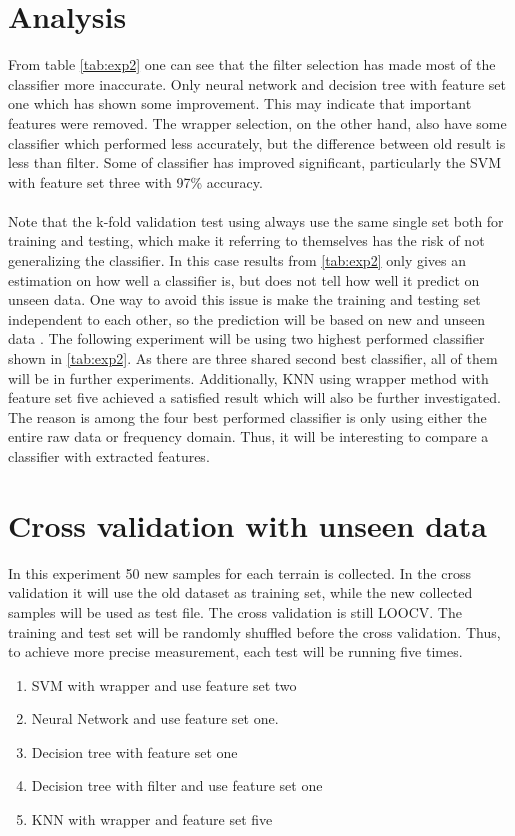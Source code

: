 \documentclass[USenglish]{ifimaster}  %
\begin{document}
	\section{Analysis}
	From table \ref{tab:exp2} one can see that the filter selection has made most of the classifier more inaccurate. Only neural network and decision tree with feature set one which has shown some improvement. This may indicate that important features were removed. The wrapper selection, on the other hand, also have some classifier which performed less accurately, but the difference between old result is less than filter. Some of classifier has improved significant, particularly the SVM with feature set three with 97\% accuracy.
	\\
	\\
	Note that the k-fold validation test using always use the same single set both for training and testing, which make it referring to themselves has the risk of not generalizing the classifier. In this case results from \ref{tab:exp2} only gives an estimation on how well a classifier is, but does not tell how well it predict on unseen data. One way to avoid this issue is make the training and testing set independent to each other, so the prediction will be based on new and unseen data \cite{26b23e912c654fe4b7478fd910130195}. The following experiment will be using two highest performed classifier shown in \ref{tab:exp2}. As there are three shared second best classifier, all of them will be in further experiments. Additionally, KNN using wrapper method with feature set five achieved a satisfied result which will also be further investigated. The reason is among the four best performed classifier is only using either the entire raw data or frequency domain. Thus, it will be interesting to compare a classifier with extracted features.
	
	\section{Cross validation with unseen data} \label{seq:crossunseen}
	In this experiment 50 new samples for each terrain is collected. In the cross validation it will use the old dataset as training set, while the new collected samples will be used as test file. The cross validation is still LOOCV. The training and test set will be randomly shuffled before the cross validation. Thus, to achieve more precise measurement, each test will be running five times.
	
	\begin{enumerate}
		\item SVM with wrapper and use feature set two
		\item Neural Network and use feature set one.
		\item Decision tree with feature set one
		\item Decision tree with filter and use feature set one
		\item KNN with wrapper and feature set five
	\end{enumerate}
	
\end{document}
